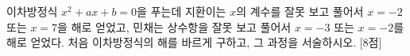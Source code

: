 이차방정식 $x^2+ax+b=0$을 푸는데 지환이는 $x$의 계수를 잘못 보고 풀어서 $x=-2$ 또는 $x=7$을 해로 얻었고, 민채는 상수항을 잘못 보고 풀어서 $x=-3$ 또는 $x=-2$를 해로 얻었다. 처음 이차방정식의 해를 바르게 구하고, 그 과정을 서술하시오.  \mbox{[8점]}
